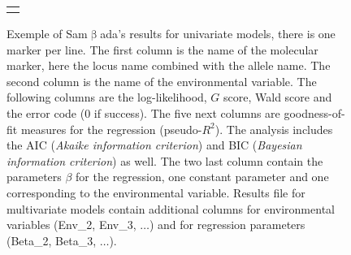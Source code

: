 \documentclass[a4paper,11pt]{article}
\newcommand{\smb}{\textsf{Sam$\upbeta$ada}}
\begin{document}
\begin{figure}[htbp]
\begin{turn}{90}
\begin{tabular}{c}
\\
\begin{minipage}{1.2\textheight}
\caption[Extrait d'un fichier de résultats de \smb\ pour des modèles univariés.]
{Exemple of \smb's results for univariate models, there is one marker per line.
The first column is the name of the molecular marker, here the locus name combined with the allele name.
The second column is the name of the environmental variable.
The following columns are the log-likelihood, $G$ score, Wald score and the error code ($0$ if success).
The five next columns are goodness-of-fit measures for the regression (pseudo-$R^2$).
The analysis includes the AIC (\textit{Akaike information criterion}) and BIC (\textit{Bayesian information criterion}) as well.
The two last column contain the parameters $\beta$ for the regression, one constant parameter and one corresponding to the environmental variable.
Results file for multivariate models contain additional columns for environmental variables (Env\_2, Env\_3, $\dots$) and for regression parameters (Beta\_2, Beta\_3, $\dots$).
}
\label{fig:fichier-res-univ}
\end{minipage}\\
\end{tabular}
\end{turn}
\hfill
\end{figure}
\end{document}
